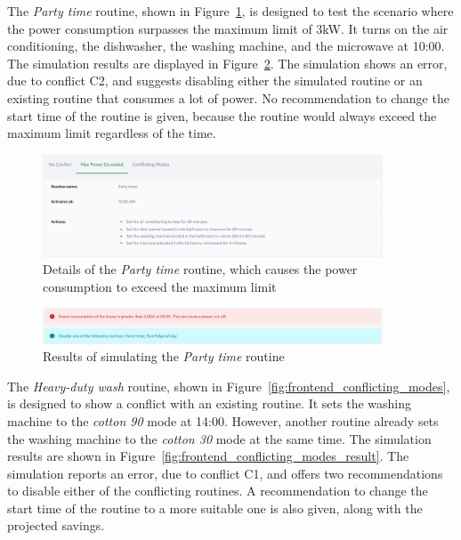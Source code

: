 The \textit{Party time} routine, shown in Figure~\ref{fig:frontend_max_power_exceeded}, is designed to test the scenario where the power consumption surpasses the maximum limit of 3kW. It turns on the air conditioning, the dishwasher, the washing machine, and the microwave at 10:00. The simulation results are displayed in Figure~\ref{fig:frontend_max_power_exceeded_result}. The simulation shows an error, due to conflict C2, and suggests disabling either the simulated routine or an existing routine that consumes a lot of power. No recommendation to change the start time of the routine is given, because the routine would always exceed the maximum limit regardless of the time.

\begin{figure}
    \centering
    \includegraphics[width=0.9\textwidth]{images/frontend/max_power_exceeded.png}
    \caption{Details of the \textit{Party time} routine, which causes the power consumption to exceed the maximum limit}%
    \label{fig:frontend_max_power_exceeded}
\end{figure}

\begin{figure}
    \centering
    \includegraphics[width=0.9\textwidth]{images/frontend/max_power_exceeded_result.png}
    \caption{Results of simulating the \textit{Party time} routine}%
    \label{fig:frontend_max_power_exceeded_result}
\end{figure}

The \textit{Heavy-duty wash} routine, shown in Figure~\ref{fig:frontend_conflicting_modes}, is designed to show a conflict with an existing routine. It sets the washing machine to the \textit{cotton 90} mode at 14:00. However, another routine already sets the washing machine to the \textit{cotton 30} mode at the same time. The simulation results are shown in Figure~\ref{fig:frontend_conflicting_modes_result}. The simulation reports an error, due to conflict C1, and offers two recommendations to disable either of the conflicting routines. A recommendation to change the start time of the routine to a more suitable one is also given, along with the projected savings.

